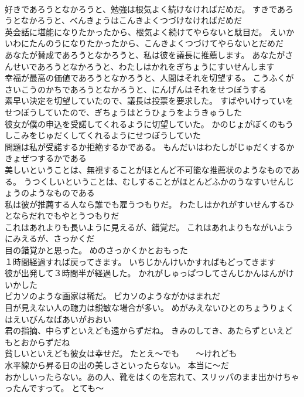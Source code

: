 \documentclass[8pt]{extreport}
\begin{document}
\begin{CJK}{UTF8}{min}
\\	好きであろうとなかろうと、勉強は根気よく続けなければだめだ。	すきであろうとなかろうと、べんきょうはこんきよくつづけなければだめだ 
\\	英会話に堪能になりたかったから、根気よく続けてやらないと駄目だ。	えいかいわにたんのうになりたかったから、こんきよくつづけてやらないとだめだ 
\\	あなたが賛成であろうとなかろうと、私は彼を議長に推薦します。	あなたがさんせいであろうとなかろうと、わたしはかれをぎちょうにすいせんします 
\\	幸福が最高の価値であろうとなかろうと、人間はそれを切望する。	こうふくがさいこうのかちであろうとなかろうと、にんげんはそれをせつぼうする 
\\	素早い決定を切望していたので、議長は投票を要求した。	すばやいけっていをせつぼうしていたので、ぎちょうはとうひょうをようきゅうした 
\\	彼女が僕の申込を受諾してくれるように切望していた。	かのじょがぼくのもうしこみをじゅだくしてくれるようにせつぼうしていた 
\\	問題は私が受諾するか拒絶するかである。	もんだいはわたしがじゅだくするかきょぜつするかである 
\\	美しいということは、無視することがほとんど不可能な推薦状のようなものである。	うつくしいということは、むしすることがほとんどふかのうなすいせんじょうのようなものである 
\\	私は彼が推薦する人なら誰でも雇うつもりだ。	わたしはかれがすいせんするひとならだれでもやとうつもりだ 
\\	これはあれよりも長いように見えるが、錯覚だ。	これはあれよりもながいようにみえるが、さっかくだ 
\\	目の錯覚かと思った。	めのさっかくかとおもった 
\\	１時間経過すれば戻ってきます。	いちじかんけいかすればもどってきます 
\\	彼が出発して３時間半が経過した。	かれがしゅっぱつしてさんじかんはんがけいかした 
\\	ピカソのような画家は稀だ。	ピカソのようながかはまれだ 
\\	目が見えない人の聴力は鋭敏な場合が多い。	めがみえないひとのちょうりょくはえいびんなばあいがおおい 
\\	君の指摘、中らずといえども遠からずだね。	きみのしてき、あたらずといえどもとおからずだね 
\\	貧しいといえども彼女は幸せだ。	たとえ～でも　　～けれども
\\	水平線から昇る日の出の美しさといったらない。	本当に～だ
\\	おかしいったらない。あの人、靴をはくのを忘れて、スリッパのまま出かけちゃったんですって。	とても～

\end{CJK}
\end{document}
